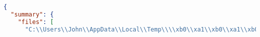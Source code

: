 \begin{lstlisting}[language=json, label=lst:example_report_or, caption=Original report entries]
{
  "summary": {
    "files": [
      "C:\\Users\\John\\AppData\\Local\\Temp\\\\xb0\\xa1\\xb0\\xa1\\xb0\\xa1\\
\end{lstlisting}
